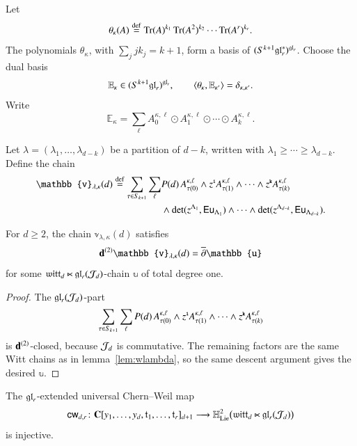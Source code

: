 \documentclass[main.tex]{subfiles}
\begin{document}
Let
\[
  \theta_\kappa(A)
  \overset{\rm def}{=}
  \operatorname{Tr}(A)^{k_1}\operatorname{Tr}(A^2)^{k_2}\cdots\operatorname{Tr}(A^r)^{k_r}.
\]
The polynomials $\theta_\kappa$, with $\sum_j j k_j=k+1$, form a basis of
$(S^{k+1}\mathfrak{gl}_r^*)^{\mathfrak{gl}_r}$.  Choose the dual basis
\[
  \mathbb{E}_\kappa \in (S^{k+1}\mathfrak{gl}_r)^{\mathfrak{gl}_r},
  \qquad
  \langle \theta_\kappa,\mathbb{E}_{\kappa'}\rangle=\delta_{\kappa,\kappa'}.
\]
Write
\[
  \mathbb{E}_\kappa
  =
  \sum_{\ell}
  A^{\kappa,\ell}_0\odot A^{\kappa,\ell}_1\odot\cdots\odot A^{\kappa,\ell}_k .
\]

\begin{definition}\label{dfn:partitionvv}
Let $\lambda=(\lambda_1,\ldots,\lambda_{d-k})$ be a partition of $d-k$, written with
$\lambda_1\geq\cdots\geq\lambda_{d-k}$.  Define the chain
\[
\begin{aligned}
\mathbb{v}_{\lambda,\kappa}(d)
\define
\sum_{\tau\in S_{k+1}}\sum_{\ell}
&
P(d)\,
A^{\kappa,\ell}_{\tau(0)}
\wedge z^{\1}A^{\kappa,\ell}_{\tau(1)}
\wedge\cdots\wedge
z^{\kkk}A^{\kappa,\ell}_{\tau(k)}
\\
&\wedge
\det(z^{\Lambda_1},\mathsf{Eu}_{\Lambda_1})
\wedge\cdots\wedge
\det(z^{\Lambda_{d-k}},\mathsf{Eu}_{\Lambda_{d-k}}).
\end{aligned}
\]
\end{definition}
\begin{lemma}\label{lem:wlambdaMixed}
For $d\geq 2$, the chain $\mathbb{v}_{\lambda,\kappa}(d)$ satisfies
\[
  \bd^{(2)}\mathbb{v}_{\lambda,\kappa}(d)
  =
  \dbar \mathbb{u}
\]
for some $\mathfrak{witt}_d\ltimes \mathfrak{gl}_r(\mathcal J_d)$-chain $\mathbb{u}$ of total degree one.
\end{lemma}

\begin{proof}
The $\mathfrak{gl}_r(\mathcal J_d)$-part
\[
  \sum_{\tau\in S_{k+1}}\sum_{\ell}
  P(d)\,
  A^{\kappa,\ell}_{\tau(0)}
  \wedge z^{{\textbf{\texttt{\tiny{1}}}}}A^{\kappa,\ell}_{\tau(1)}
  \wedge\cdots\wedge z^{\textbf{\texttt{\tiny{k}}}}A^{\kappa,\ell}_{\tau(k)}
\]
is $\mathbf d^{(2)}$-closed, because $\mathcal J_d$ is commutative.  The remaining factors are the same Witt chains as in
lemma~\ref{lem:wlambda}, so the same descent argument gives the desired $\mathbb{u}$.
\end{proof}

\begin{theorem}\label{thm:cwdr}
The $\mathfrak{gl}_r$-extended universal Chern--Weil map
\[
  \mathsf{cw}_{d,r}
  \colon
  \mathbf{C}[y_1,\ldots,y_d,\mathfrak{t}_1,\ldots,\mathfrak{t}_r]_{d+1}
  \longrightarrow
  \mathbb H^2_{\operatorname{Lie}}
  \bigl(\mathfrak{witt}_d\ltimes \mathfrak{gl}_r(\mathcal J_d)\bigr)
\]
is injective.
\end{theorem}
\end{document}
